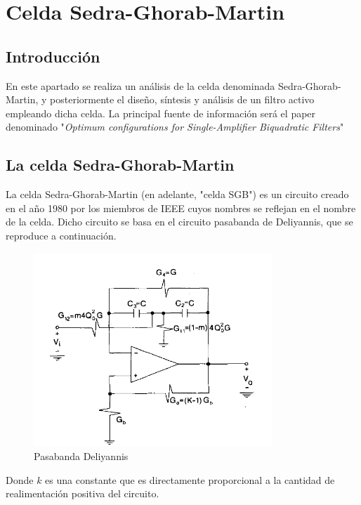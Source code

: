 \section{Celda Sedra-Ghorab-Martin}

\subsection{Introducci\'on}
En este apartado se realiza un an\'alisis de la celda denominada Sedra-Ghorab-Martin, y posteriormente el dise\~no, s\'intesis y an\'alisis de un filtro activo empleando dicha celda. La principal fuente de informaci\'on ser\'a el paper denominado "\textit{Optimum configurations for Single-Amplifier Biquadratic Filters}"

\subsection{La celda Sedra-Ghorab-Martin}

La celda Sedra-Ghorab-Martin (en adelante, "celda SGB") es un circuito creado en el a\~no 1980 por los miembros de IEEE cuyos nombres se reflejan en el nombre de la celda. Dicho circuito se basa en el circuito pasabanda de Deliyannis, que se reproduce a continuaci\'on.

\begin{figure}[H] \label{fig:EJ3_deliyannis}
    \centering
    \includegraphics[width=0.8\textwidth]{../EJ3/Resources/deliyannis_cell.png}
    \caption{Pasabanda Deliyannis}
\end{figure}

Donde $k$ es una constante que es directamente proporcional a la cantidad de realimentaci\'on positiva del circuito.

